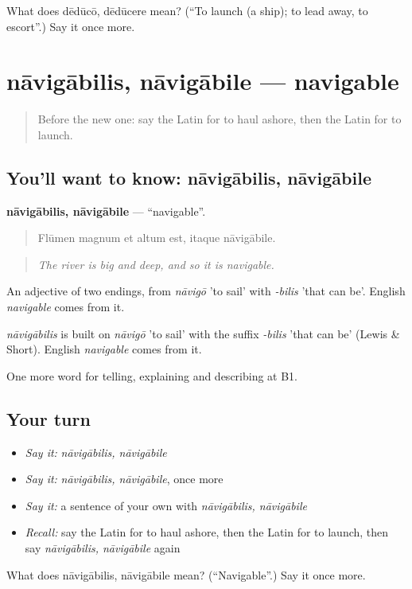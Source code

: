 \begin{tcolorbox}[breakable,colback=teal!4,colframe=teal!35!black,title={Before you move on}]
What does dēdūcō, dēdūcere mean? (\textquotedblleft{}To launch (a ship); to lead away, to escort\textquotedblright{}.) Say it once more.
\end{tcolorbox}
\section[nāvigābilis, nāvigābile]{nāvigābilis, nāvigābile — navigable}

\label{lesson:LA-C439-navigabilis}



\begin{quote}
Before the new one: say the Latin for to haul ashore, then the Latin for to launch.
\end{quote}

\subsection*{You'll want to know: nāvigābilis, nāvigābile}
\textbf{nāvigābilis, nāvigābile} — \textquotedblleft{}navigable\textquotedblright{}.

\begin{quote}
Flūmen magnum et altum est, itaque nāvigābile.
\end{quote}

\begin{quote}
\emph{The river is big and deep, and so it is navigable.}
\end{quote}

An adjective of two endings, from \emph{nāvigō} 'to sail' with \emph{-bilis} 'that can be'. English \emph{navigable} comes from it.

\begin{cousinweb}
\emph{nāvigābilis} is built on \emph{nāvigō} 'to sail' with the suffix \emph{-bilis} 'that can be' (Lewis \& Short). English \emph{navigable} comes from it.
\end{cousinweb}

\begin{grammarlens}[title={What you've built}]
One more word for telling, explaining and describing at B1.
\end{grammarlens}

\subsection*{Your turn}
\begin{itemize}
\raggedright
  \item \emph{Say it:} \emph{nāvigābilis, nāvigābile}
  \item \emph{Say it:} \emph{nāvigābilis, nāvigābile}, once more
  \item \emph{Say it:} a sentence of your own with \emph{nāvigābilis, nāvigābile}
  \item \emph{Recall:} say the Latin for to haul ashore, then the Latin for to launch, then say \emph{nāvigābilis, nāvigābile} again
\end{itemize}

\begin{tcolorbox}[breakable,colback=teal!4,colframe=teal!35!black,title={Before you move on}]
What does nāvigābilis, nāvigābile mean? (\textquotedblleft{}Navigable\textquotedblright{}.) Say it once more.
\end{tcolorbox}
